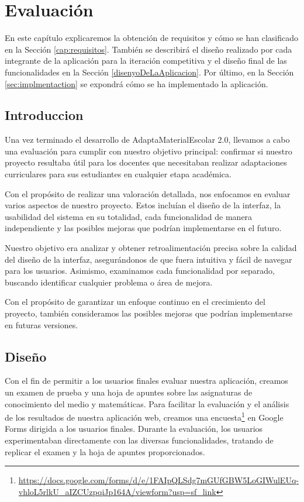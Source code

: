 \chapter{Evaluación}
\label{cap:evaluacion}
En este capítulo explicaremos la obtención de requisitos y cómo se han clasificado en la Sección \ref{cap:requisitos}. También se describirá el diseño realizado por cada integrante de la aplicación para la iteración competitiva y el diseño final de las funcionalidades en la Sección \ref{disenyoDeLaAplicacion}. Por último, en la Sección \ref{sec:implmentaction} se expondrá cómo se ha implementado la aplicación.

\section{Introduccion}\label{sec:introEvaluacion}
Una vez terminado el desarrollo de AdaptaMaterialEscolar 2.0, llevamos a cabo una evaluación para cumplir con nuestro objetivo principal: confirmar si nuestro proyecto resultaba útil para los docentes que necesitaban realizar adaptaciones curriculares para sus estudiantes en cualquier etapa académica.

Con el propósito de realizar una valoración detallada, nos enfocamos en evaluar varios aspectos de nuestro proyecto. Estos incluían el diseño de la interfaz, la usabilidad del sistema en su totalidad, cada funcionalidad de manera independiente y las posibles mejoras que podrían implementarse en el futuro.

Nuestro objetivo era analizar y obtener retroalimentación precisa sobre la calidad del diseño de la interfaz, asegurándonos de que fuera intuitiva y fácil de navegar para los usuarios. Asimismo, examinamos cada funcionalidad por separado, buscando identificar cualquier problema o área de mejora.

Con el propósito de garantizar un enfoque continuo en el crecimiento del proyecto, también consideramos las posibles mejoras que podrían implementarse en futuras versiones.

\section{Diseño}\label{sec:disenyoEvaluacion}
Con el fin de permitir a los usuarios finales evaluar nuestra aplicación, creamos un examen de prueba y una hoja de apuntes sobre las asignaturas de conocimiento del medio y matemáticas.
Para facilitar la evaluación y el análisis de los resultados de nuestra aplicación web, creamos una encuesta\footnote{\url{https://docs.google.com/forms/d/e/1FAIpQLSdg7mGUfGBW5LoGIWulEUq-vhloL5rlkU_aIZCUzpqiJp164A/viewform?usp=sf_link}} en Google Forms dirigida a los usuarios finales. Durante la evaluación, los usuarios experimentaban directamente con las diversas funcionalidades, tratando de replicar el examen y la hoja de apuntes proporcionados.

